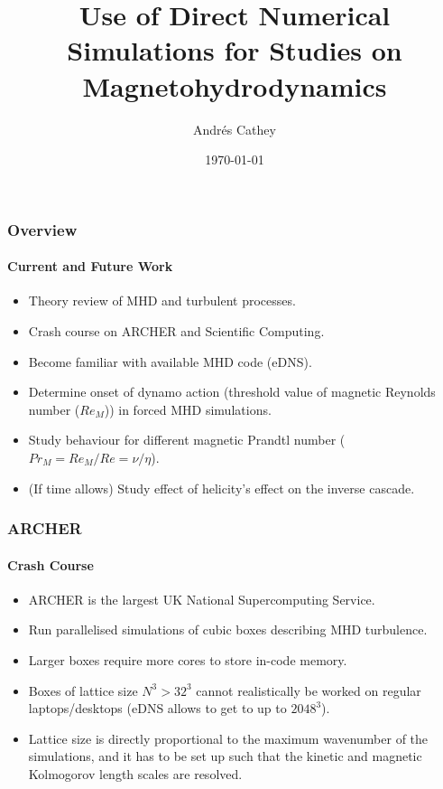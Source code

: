 \documentclass{beamer}
\title{Use of Direct Numerical Simulations for Studies on Magnetohydrodynamics}
\author{Andr\'es Cathey}
\institute{The University of Edinburgh}
\date{\today}
\begin{document}
\frame{\titlepage}

\begin{frame}
 \frametitle{Overview} %
 \framesubtitle{Current and Future Work}
 
 \begin{itemize}
  \item Theory review of MHD and turbulent processes.
  \item Crash course on ARCHER and Scientific Computing.
  \item Become familiar with available MHD code (eDNS).
  \item Determine onset of dynamo action (threshold value of magnetic Reynolds number ($Re_M$)) in forced MHD simulations.
  \item<2-> {\color{blue}Study behaviour for different magnetic Prandtl number ($Pr_M = Re_M / Re = \nu / \eta$).}
  \item<2-> {\color{blue}(If time allows) Study effect of helicity's effect on the inverse cascade.}
 \end{itemize}
  
\end{frame}

\begin{frame}
 \frametitle{ARCHER}
 \framesubtitle{Crash Course}
 
 \begin{itemize}
  \item ARCHER is the largest UK National Supercomputing Service.
  \item Run parallelised simulations of cubic boxes describing MHD turbulence.
  \item Larger boxes require more cores to store in-code memory.
  \item Boxes of lattice size $N^3 > 32^3$ cannot realistically be worked on regular laptops/desktops (eDNS allows to get to up to $2048^3$).
  \item Lattice size is directly proportional to the maximum wavenumber of the simulations, and it has to be set up such that the kinetic and magnetic Kolmogorov length scales are resolved.
 \end{itemize}
 
\end{frame}
\end{document}
